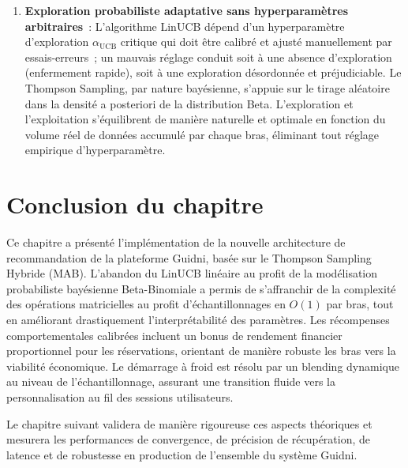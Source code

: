 \begin{enumerate}
    \item \textbf{Exploration probabiliste adaptative sans hyperparamètres arbitraires}~: 
    L'algorithme LinUCB dépend d'un hyperparamètre d'exploration $\alpha_{\text{UCB}}$ critique qui doit être calibré et ajusté manuellement par essais-erreurs~; un mauvais réglage conduit soit à une absence d'exploration (enfermement rapide), soit à une exploration désordonnée et préjudiciable. Le Thompson Sampling, par nature bayésienne, s'appuie sur le tirage aléatoire dans la densité a posteriori de la distribution Beta. L'exploration et l'exploitation s'équilibrent de manière naturelle et optimale en fonction du volume réel de données accumulé par chaque bras, éliminant tout réglage empirique d'hyperparamètre.
\end{enumerate}

\section*{Conclusion du chapitre}

Ce chapitre a présenté l'implémentation de la nouvelle architecture de recommandation de la plateforme Guidni, basée sur le Thompson Sampling Hybride (MAB). L'abandon du LinUCB linéaire au profit de la modélisation probabiliste bayésienne Beta-Binomiale a permis de s'affranchir de la complexité des opérations matricielles au profit d'échantillonnages en $O(1)$ par bras, tout en améliorant drastiquement l'interprétabilité des paramètres. Les récompenses comportementales calibrées incluent un bonus de rendement financier proportionnel pour les réservations, orientant de manière robuste les bras vers la viabilité économique. Le démarrage à froid est résolu par un blending dynamique au niveau de l'échantillonnage, assurant une transition fluide vers la personnalisation au fil des sessions utilisateurs.

Le chapitre suivant validera de manière rigoureuse ces aspects théoriques et mesurera les performances de convergence, de précision de récupération, de latence et de robustesse en production de l'ensemble du système Guidni.
